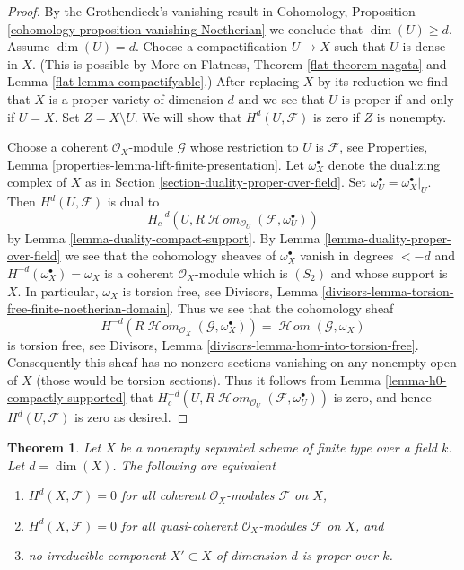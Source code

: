 \documentclass{stacks-project}
\theoremstyle{plain}
\newtheorem{theorem}[subsection]{Theorem}
\theoremstyle{definition}
\theoremstyle{remark}
\numberwithin{equation}{subsection}
\def\SheafHom{\mathop{\mathcal{H}\!\mathit{om}}\nolimits}
\begin{document}
\begin{proof}
By the Grothendieck's vanishing result in
Cohomology, Proposition \ref{cohomology-proposition-vanishing-Noetherian}
we conclude that $\dim(U) \geq d$.
Assume $\dim(U) = d$. Choose a compactification $U \to X$
such that $U$ is dense in $X$. (This is possible by
More on Flatness, Theorem \ref{flat-theorem-nagata} and
Lemma \ref{flat-lemma-compactifyable}.) After replacing $X$ by its
reduction we find that $X$ is a proper variety of dimension $d$
and we see that $U$ is proper if and only if $U = X$.
Set $Z = X \setminus U$. We will show that $H^d(U, \mathcal{F})$
is zero if $Z$ is nonempty.

\medskip\noindent
Choose a coherent $\mathcal{O}_X$-module
$\mathcal{G}$ whose restriction to $U$ is $\mathcal{F}$, see
Properties, Lemma \ref{properties-lemma-lift-finite-presentation}.
Let $\omega_X^\bullet$ denote the dualizing complex of $X$ as in
Section \ref{section-duality-proper-over-field}.
Set $\omega_U^\bullet = \omega_X^\bullet|_U$.
Then $H^d(U, \mathcal{F})$ is dual to
$$
H^{-d}_c(U, R\SheafHom_{\mathcal{O}_U}(\mathcal{F}, \omega_U^\bullet))
$$
by Lemma \ref{lemma-duality-compact-support}. By
Lemma \ref{lemma-duality-proper-over-field} we see that
the cohomology sheaves of $\omega_X^\bullet$ vanish in degrees $< -d$
and $H^{-d}(\omega_X^\bullet) = \omega_X$ is a coherent
$\mathcal{O}_X$-module which is $(S_2)$ and whose support is $X$.
In particular, $\omega_X$ is torsion free, see
Divisors, Lemma \ref{divisors-lemma-torsion-free-finite-noetherian-domain}.
Thus we see that the cohomology sheaf
$$
H^{-d}(R\SheafHom_{\mathcal{O}_X}(\mathcal{G}, \omega_X^\bullet)) =
\SheafHom(\mathcal{G}, \omega_X)
$$
is torsion free, see
Divisors, Lemma \ref{divisors-lemma-hom-into-torsion-free}.
Consequently this sheaf has no nonzero sections vanishing
on any nonempty open of $X$ (those would be torsion sections).
Thus it follows from Lemma \ref{lemma-h0-compactly-supported} that
$H^{-d}_c(U, R\SheafHom_{\mathcal{O}_U}(\mathcal{F}, \omega_U^\bullet))$
is zero, and hence $H^d(U, \mathcal{F})$ is zero as desired.
\end{proof}

\begin{theorem}
\label{theorem-lichtenbaum}
Let $X$ be a nonempty separated scheme of finite type over a field $k$.
Let $d = \dim(X)$. The following are equivalent
\begin{enumerate}
\item $H^d(X, \mathcal{F}) = 0$ for all coherent $\mathcal{O}_X$-modules
$\mathcal{F}$ on $X$,
\item $H^d(X, \mathcal{F}) = 0$ for all quasi-coherent $\mathcal{O}_X$-modules
$\mathcal{F}$ on $X$, and
\item no irreducible component $X' \subset X$ of dimension $d$
is proper over $k$.
\end{enumerate}
\end{theorem}
\end{document}
